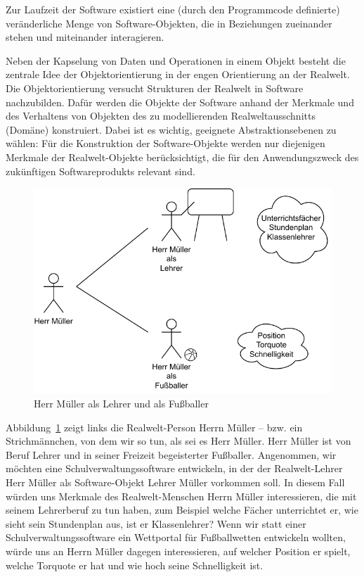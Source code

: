Zur Laufzeit der Software existiert eine (durch den Programmcode definierte) veränderliche Menge von Software-Objekten, die in Beziehungen zueinander stehen und miteinander interagieren.

Neben  der Kapselung von Daten und Operationen in einem Objekt besteht die zentrale Idee der Objektorientierung in der engen Orientierung an der Realwelt. 
Die Objektorientierung versucht Strukturen der Realwelt in Software nachzubilden. Dafür werden die Objekte der Software anhand der Merkmale und des Verhaltens von Objekten des zu modellierenden Realweltausschnitts (Domäne) konstruiert. Dabei ist es wichtig, geeignete Abstraktionsebenen zu wählen: Für die Konstruktion der Software-Objekte werden nur diejenigen Merkmale der Realwelt-Objekte berücksichtigt, die für den Anwendungszweck des zukünftigen Softwareprodukts relevant sind. 

\begin{figure}[h!]
	\centering
	\includegraphics{Bilder/Kapitel-3/mueller_lehrer_fussballer.pdf}
	\caption{Herr Müller als Lehrer und als Fußballer}
	\label{fig:mueller_lehrer_fussballer}
\end{figure}

Abbildung~\ref{fig:mueller_lehrer_fussballer} zeigt 
links die Realwelt-Person Herrn Müller – bzw. ein Strichmännchen, von dem wir so tun, als sei es Herr Müller. Herr Müller ist von Beruf Lehrer und in seiner Freizeit begeisterter Fußballer. Angenommen, wir möchten eine Schul\-verwal\-tungs\-soft\-ware entwickeln, in der der Realwelt-Lehrer Herr Müller als Software-Objekt Lehrer Müller vorkommen soll. In diesem Fall würden uns Merkmale des Realwelt-Menschen Herrn Müller interessieren, die mit seinem Lehrerberuf zu tun haben, zum Beispiel welche Fächer unterrichtet er, wie sieht sein Stundenplan aus, ist er Klassenlehrer? Wenn wir statt einer Schulverwaltungssoftware ein Wettportal für Fußballwetten entwickeln wollten, würde uns an Herrn Müller dagegen interessieren, auf welcher Position er spielt, welche Torquote er hat und wie hoch seine Schnelligkeit ist. 

